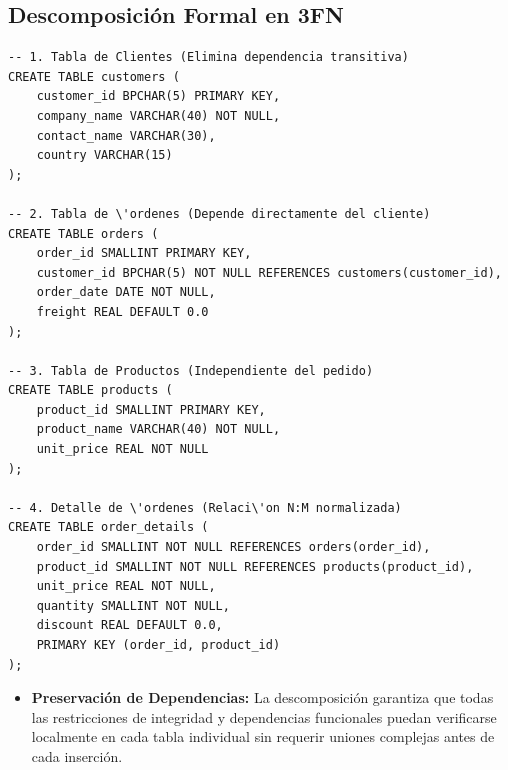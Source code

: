 \subsection{Descomposici\'on Formal en 3FN}

\begin{lstlisting}[style=sqlstyle, caption={Estructuras normalizadas en 3FN}]
-- 1. Tabla de Clientes (Elimina dependencia transitiva)
CREATE TABLE customers (
    customer_id BPCHAR(5) PRIMARY KEY,
    company_name VARCHAR(40) NOT NULL,
    contact_name VARCHAR(30),
    country VARCHAR(15)
);

-- 2. Tabla de \'ordenes (Depende directamente del cliente)
CREATE TABLE orders (
    order_id SMALLINT PRIMARY KEY,
    customer_id BPCHAR(5) NOT NULL REFERENCES customers(customer_id),
    order_date DATE NOT NULL,
    freight REAL DEFAULT 0.0
);

-- 3. Tabla de Productos (Independiente del pedido)
CREATE TABLE products (
    product_id SMALLINT PRIMARY KEY,
    product_name VARCHAR(40) NOT NULL,
    unit_price REAL NOT NULL
);

-- 4. Detalle de \'ordenes (Relaci\'on N:M normalizada)
CREATE TABLE order_details (
    order_id SMALLINT NOT NULL REFERENCES orders(order_id),
    product_id SMALLINT NOT NULL REFERENCES products(product_id),
    unit_price REAL NOT NULL,
    quantity SMALLINT NOT NULL,
    discount REAL DEFAULT 0.0,
    PRIMARY KEY (order_id, product_id)
);
\end{lstlisting}

\begin{engtip}
\begin{itemize}
    \item \textbf{Preservaci\'on de Dependencias:} La descomposici\'on garantiza que todas las restricciones de integridad y dependencias funcionales puedan verificarse localmente en cada tabla individual sin requerir uniones complejas antes de cada inserci\'on.
\end{itemize}
\end{engtip}
